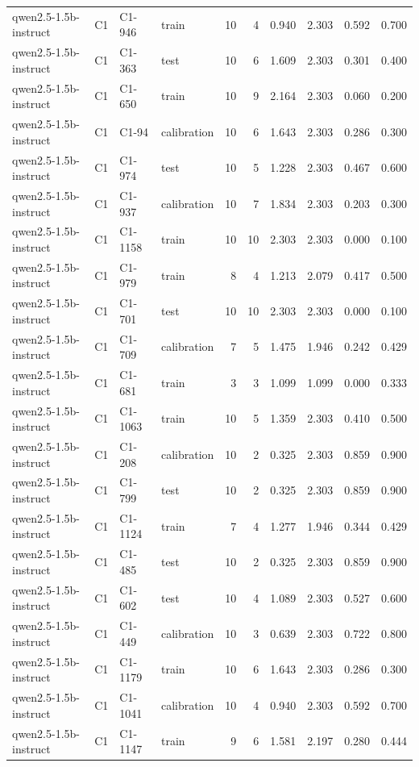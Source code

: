 \begin{table}
\begin{tabular}{llllrrrrrr}
qwen2.5-1.5b-instruct & C1 & C1-946 & train & 10 & 4 & 0.940 & 2.303 & 0.592 & 0.700 \\
qwen2.5-1.5b-instruct & C1 & C1-363 & test & 10 & 6 & 1.609 & 2.303 & 0.301 & 0.400 \\
qwen2.5-1.5b-instruct & C1 & C1-650 & train & 10 & 9 & 2.164 & 2.303 & 0.060 & 0.200 \\
qwen2.5-1.5b-instruct & C1 & C1-94 & calibration & 10 & 6 & 1.643 & 2.303 & 0.286 & 0.300 \\
qwen2.5-1.5b-instruct & C1 & C1-974 & test & 10 & 5 & 1.228 & 2.303 & 0.467 & 0.600 \\
qwen2.5-1.5b-instruct & C1 & C1-937 & calibration & 10 & 7 & 1.834 & 2.303 & 0.203 & 0.300 \\
qwen2.5-1.5b-instruct & C1 & C1-1158 & train & 10 & 10 & 2.303 & 2.303 & 0.000 & 0.100 \\
qwen2.5-1.5b-instruct & C1 & C1-979 & train & 8 & 4 & 1.213 & 2.079 & 0.417 & 0.500 \\
qwen2.5-1.5b-instruct & C1 & C1-701 & test & 10 & 10 & 2.303 & 2.303 & 0.000 & 0.100 \\
qwen2.5-1.5b-instruct & C1 & C1-709 & calibration & 7 & 5 & 1.475 & 1.946 & 0.242 & 0.429 \\
qwen2.5-1.5b-instruct & C1 & C1-681 & train & 3 & 3 & 1.099 & 1.099 & 0.000 & 0.333 \\
qwen2.5-1.5b-instruct & C1 & C1-1063 & train & 10 & 5 & 1.359 & 2.303 & 0.410 & 0.500 \\
qwen2.5-1.5b-instruct & C1 & C1-208 & calibration & 10 & 2 & 0.325 & 2.303 & 0.859 & 0.900 \\
qwen2.5-1.5b-instruct & C1 & C1-799 & test & 10 & 2 & 0.325 & 2.303 & 0.859 & 0.900 \\
qwen2.5-1.5b-instruct & C1 & C1-1124 & train & 7 & 4 & 1.277 & 1.946 & 0.344 & 0.429 \\
qwen2.5-1.5b-instruct & C1 & C1-485 & test & 10 & 2 & 0.325 & 2.303 & 0.859 & 0.900 \\
qwen2.5-1.5b-instruct & C1 & C1-602 & test & 10 & 4 & 1.089 & 2.303 & 0.527 & 0.600 \\
qwen2.5-1.5b-instruct & C1 & C1-449 & calibration & 10 & 3 & 0.639 & 2.303 & 0.722 & 0.800 \\
qwen2.5-1.5b-instruct & C1 & C1-1179 & train & 10 & 6 & 1.643 & 2.303 & 0.286 & 0.300 \\
qwen2.5-1.5b-instruct & C1 & C1-1041 & calibration & 10 & 4 & 0.940 & 2.303 & 0.592 & 0.700 \\
qwen2.5-1.5b-instruct & C1 & C1-1147 & train & 9 & 6 & 1.581 & 2.197 & 0.280 & 0.444 \\

\end{tabular}
\end{table}
